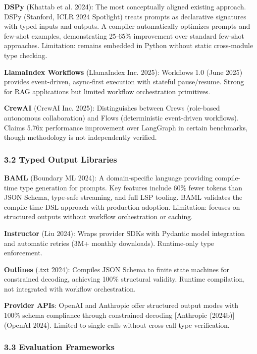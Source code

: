 \documentclass[
]{article}
\begin{document}
\textbf{DSPy} (Khattab et al. 2024): The most conceptually aligned
existing approach. DSPy (Stanford, ICLR 2024 Spotlight) treats prompts
as declarative signatures with typed inputs and outputs. A compiler
automatically optimizes prompts and few-shot examples, demonstrating
25-65\% improvement over standard few-shot approaches. Limitation:
remains embedded in Python without static cross-module type checking.

\textbf{LlamaIndex Workflows} (LlamaIndex Inc. 2025): Workflows 1.0
(June 2025) provides event-driven, async-first execution with stateful
pause/resume. Strong for RAG applications but limited workflow
orchestration primitives.

\textbf{CrewAI} (CrewAI Inc. 2025): Distinguishes between Crews
(role-based autonomous collaboration) and Flows (deterministic
event-driven workflows). Claims 5.76x performance improvement over
LangGraph in certain benchmarks, though methodology is not independently
verified.

\subsubsection{3.2 Typed Output Libraries}\label{typed-output-libraries}

\textbf{BAML} (Boundary ML 2024): A domain-specific language providing
compile-time type generation for prompts. Key features include 60\%
fewer tokens than JSON Schema, type-safe streaming, and full LSP
tooling. BAML validates the compile-time DSL approach with production
adoption. Limitation: focuses on structured outputs without workflow
orchestration or caching.

\textbf{Instructor} (Liu 2024): Wraps provider SDKs with Pydantic model
integration and automatic retries (3M+ monthly downloads). Runtime-only
type enforcement.

\textbf{Outlines} ({.txt} 2024): Compiles JSON Schema to finite state
machines for constrained decoding, achieving 100\% structural validity.
Runtime compilation, not integrated with workflow orchestration.

\textbf{Provider APIs}: OpenAI and Anthropic offer structured output
modes with 100\% schema compliance through constrained decoding
{[}Anthropic (2024b){]}(OpenAI 2024). Limited to single calls without
cross-call type verification.

\subsubsection{3.3 Evaluation Frameworks}\label{evaluation-frameworks}
\end{document}

